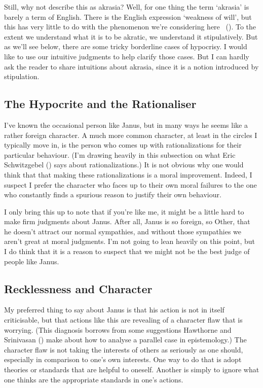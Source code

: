 \documentclass[
  10pt,
  letterpaper,
  twoside]{scrbook}
\begin{document}
Still, why not describe this as akrasia? Well, for one thing the term
`akrasia' is barely a term of English. There is the English expression
`weakness of will', but this has very little to do with the phenomenon
we're considering here ~(). To the
extent we understand what it is to be akratic, we understand it
stipulatively. But as we'll see below, there are some tricky borderline
cases of hypocrisy. I would like to use our intuitive judgments to help
clarify those cases. But I can hardly ask the reader to share intuitions
about akrasia, since it is a notion introduced by stipulation.

\subsection{The Hypocrite and the
Rationaliser}\label{thehypocriteandtherationaliser}

I've known the occasional person like {Janus}, but in many ways he seems
like a rather foreign character. A much more common character, at least
in the circles I typically move in, is the person who comes up with
rationalizations for their particular behaviour. (I'm drawing heavily in
this subsection on what Eric Schwitzgebel
() says about rationalizations.) It
is not obvious why one would think that that making these
rationalizations is a moral improvement. Indeed, I suspect I prefer the
character who faces up to their own moral failures to the one who
constantly finds a spurious reason to justify their own behaviour.

I only bring this up to note that if you're like me, it might be a
little hard to make firm judgments about {Janus}. After all, {Janus} is
so foreign, so Other, that he doesn't attract our normal sympathies, and
without those sympathies we aren't great at moral judgments. I'm not
going to lean heavily on this point, but I do think that it is a reason
to suspect that we might not be the best judge of people like {Janus}.

\subsection{Recklessness and Character}\label{recklessnessandcharacter}

My preferred thing to say about {Janus} is that his action is not in
itself criticisable, but that actions like this are revealing of a
character flaw that is worrying. (This diagnosis borrows from some
suggestions Hawthorne and Srinivasan
() make about how to analyse
a parallel case in epistemology.) The character flaw is not taking the
interests of others as seriously as one should, especially in comparison
to one's own interests. One way to do that is adopt theories or
standards that are helpful to oneself. Another is simply to ignore what
one thinks are the appropriate standards in one's actions.
\end{document}
